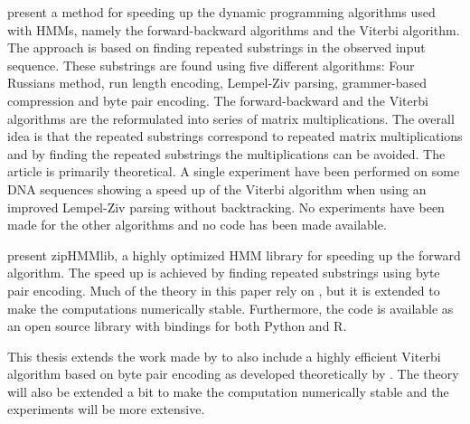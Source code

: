 \citet{lifshits2009speeding} present a method for speeding up the dynamic
programming algorithms used with HMMs, namely the forward-backward algorithms
and the Viterbi algorithm. The approach is based on finding repeated substrings
in the observed input sequence. These substrings are found using five different
algorithms: Four Russians method, run length encoding, Lempel-Ziv parsing,
grammer-based compression and byte pair encoding. The forward-backward and the
Viterbi algorithms are the reformulated into series of matrix
multiplications. The overall idea is that the repeated substrings correspond to
repeated matrix multiplications and by finding the repeated substrings the
multiplications can be avoided. The article is primarily theoretical. A single
experiment have been performed on some DNA sequences showing a speed up of the
Viterbi algorithm when using an improved Lempel-Ziv parsing without
backtracking. No experiments have been made for the other algorithms and no
code has been made available.

\citet{sand2013ziphmmlib} present zipHMMlib, a highly optimized HMM library for
speeding up the forward algorithm. The speed up is achieved by finding repeated
substrings using byte pair encoding. Much of the theory in this paper rely on
\cite{lifshits2009speeding}, but it is extended to make the computations
numerically stable. Furthermore, the code is available as an open source
library with bindings for both Python and R.

This thesis extends the work made by \citet{sand2013ziphmmlib} to also include
a highly efficient Viterbi algorithm based on byte pair encoding as developed
theoretically by \citet{lifshits2009speeding}. The theory will also be extended
a bit to make the computation numerically stable and the experiments will be
more extensive.

